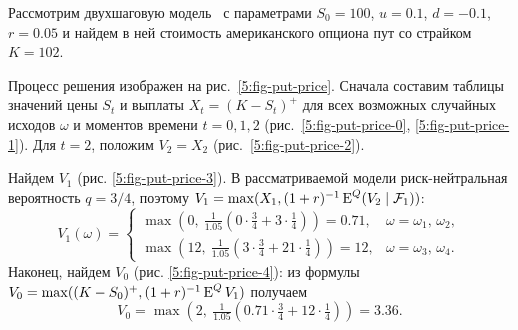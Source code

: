 \begin{example}
Рассмотрим двухшаговую модель \crr\ с параметрами $S_0=100$, $u=0.1$, $d=-0.1$, $r=0.05$ и найдем в ней стоимость американского опциона пут со страйком $K=102$.

Процесс решения изображен на рис.~\ref{5:fig-put-price}.
Сначала составим таблицы значений цены $S_t$ и выплаты $X_t = (K-S_t)^+$ для всех возможных случайных исходов $\omega$ и моментов времени $t=0,1,2$ (рис.~\ref{5:fig-put-price-0}, \ref{5:fig-put-price-1}).
Для $t=2$, положим $V_2 = X_2$ (рис.~\ref{5:fig-put-price-2}). 

Найдем $V_1$ (рис. \ref{5:fig-put-price-3}).
В рассматриваемой модели риск-нейтральная вероятность $q=3/4$, поэтому $V_1 = \max(X_1, (1+r)^{-1}\operatorname{E}^Q(V_2\mid \mathcal{F}_1))$:
\[
V_1(\omega) = 
\begin{cases}
\max(0,\ \tfrac{1}{1.05}(0\cdot\tfrac34 + 3\cdot\tfrac14)) = 0.71,
  &\omega=\omega_1,\,\omega_2,\\
\max(12,\ \tfrac{1}{1.05}(3\cdot\tfrac34 + 21\cdot\tfrac14)) = 12,
  &\omega=\omega_3,\,\omega_4.
\end{cases}
\]
Наконец, найдем $V_0$ (рис. \ref{5:fig-put-price-4}): из формулы $V_0 = \max((K-S_0)^+, (1+r)^{-1}\operatorname{E}^Q V_1)$ получаем
\[
V_0 = \max(2,\ \tfrac{1}{1.05} (0.71\cdot\tfrac34 + 12\cdot\tfrac14)) = 3.36.
\]


\end{example}

